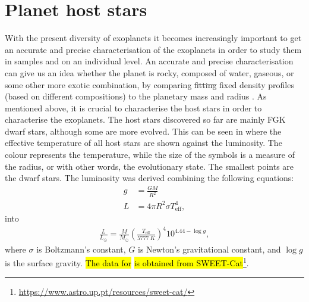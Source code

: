\section{Planet host stars}
\label{sec:planet_host_stars}

With the present diversity of exoplanets it becomes increasingly important to get an accurate and
precise characterisation of the exoplanets in order to study them in samples and on an individual
level. An accurate and precise characterisation can give us an idea whether the planet is rocky,
composed of water, gaseous, or some other more exotic combination, by comparing \st{fitting} fixed
density profiles (based on different compositions) to the planetary mass and radius
\citep[see][e.g.]{Dorn2015}. As mentioned above, it is crucial to characterise the host stars in
order to characterise the exoplanets. The host stars discovered so far are mainly FGK dwarf stars,
although some are more evolved. This can be seen in  where the effective
temperature of all host stars are shown against the luminosity. The colour represents the
temperature, while the size of the symbols is a measure of the radius, or with other words, the
evolutionary state. The smallest points are the dwarf stars. The luminosity was derived combining
the following equations:
\begin{align*}
  g &= \frac{GM}{R^2} \\
  L &= 4\pi R^2 \sigma T_\mathrm{eff}^4,
\end{align*}
into
\begin{align}
  \frac{L}{L_\odot} = \frac{M}{M_\odot} \left(\frac{T_\mathrm{eff}}{\SI{5777}{K}}\right)^4 10^{4.44-\log g},
\end{align}
where $\sigma$ is Boltzmann's constant, $G$ is Newton's gravitational constant, and $\log g$ is the
surface gravity. \hl{The data for}  \hl{is obtained from
SWEET-Cat}\footnote{ \url{https://www.astro.up.pt/resources/sweet-cat/}}.

